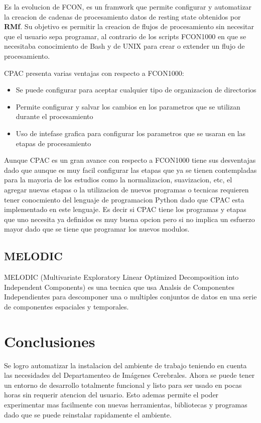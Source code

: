 \documentclass{article}
\begin{document}
Es la evolucion de FCON, es un framwork que permite configurar y automatizar la creacion de cadenas de procesamiento datos de resting state obtenidos por \textbf{RMf}.
Su objetivo es permitir la creacion de flujos de procesamiento sin necesitar que el usuario sepa programar, al contrario de los scripts FCON1000 en que se necesitaba conocimiento de Bash y de UNIX para crear o extender un flujo de procesamiento.

CPAC presenta varias ventajas con respecto a FCON1000:
\begin{itemize}
\item Se puede configurar para aceptar cualquier tipo
  de organizacion de directorios
\item{Permite configurar y salvar los cambios en los parametros que se utilizan durante el procesamiento}
\item{Uso de intefase grafica para configurar los parametros que se usaran en las etapas de procesamiento}
\end{itemize}

Aunque CPAC es un gran avance con respecto a FCON1000 tiene sus desventajas dado que aunque es muy facil configurar las etapas que ya se tienen contempladas para la mayoria de los estudios como la normalizacion, suavizacion, etc, el agregar nuevas etapas o la utilizacion de nuevos programas o tecnicas requieren tener conocmiento del lenguaje de programacion Python dado que CPAC esta implementado en este lenguaje. Es decir si CPAC tiene los programas y etapas que uno necesita ya definidos es muy buena opcion pero si no implica un esfuerzo mayor dado que se tiene que programar los nuevos modulos.

\subsection{MELODIC}

MELODIC (Multivariate Exploratory Linear Optimized Decomposition into Independent Components) es una tecnica que usa Analsis de Componentes Independientes para descomponer una o multiples conjuntos de datos en una serie de componentes espaciales y temporales.

\section{Conclusiones}

Se logro automatizar la instalacion del ambiente de trabajo teniendo en cuenta las necesidades del Departamenteo de Imágenes Cerebrales. Ahora se puede tener un entorno de desarrollo totalmente funcional y listo para ser usado en pocas horas sin requerir atencion del usuario. Esto ademas permite el poder experimentar mas facilmente con nuevas herramientas, bibliotecas y programas dado que se puede reinstalar rapidamente el ambiente.
\end{document}
